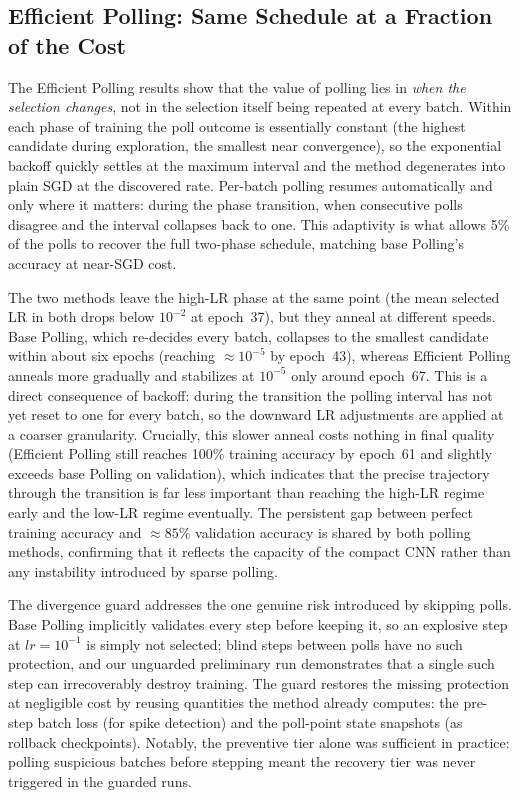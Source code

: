 \documentclass[conference]{IEEEtran}
\begin{document}
\subsection{Efficient Polling: Same Schedule at a Fraction of the Cost}

The Efficient Polling results show that the value of polling lies in \emph{when the selection changes}, not in the selection itself being repeated at every batch. Within each phase of training the poll outcome is essentially constant (the highest candidate during exploration, the smallest near convergence), so the exponential backoff quickly settles at the maximum interval and the method degenerates into plain SGD at the discovered rate. Per-batch polling resumes automatically and only where it matters: during the phase transition, when consecutive polls disagree and the interval collapses back to one. This adaptivity is what allows 5\% of the polls to recover the full two-phase schedule, matching base Polling's accuracy at near-SGD cost.

The two methods leave the high-LR phase at the same point (the mean selected LR in both drops below $10^{-2}$ at epoch~37), but they anneal at different speeds. Base Polling, which re-decides every batch, collapses to the smallest candidate within about six epochs (reaching $\approx 10^{-5}$ by epoch~43), whereas Efficient Polling anneals more gradually and stabilizes at $10^{-5}$ only around epoch~67. This is a direct consequence of backoff: during the transition the polling interval has not yet reset to one for every batch, so the downward LR adjustments are applied at a coarser granularity. Crucially, this slower anneal costs nothing in final quality (Efficient Polling still reaches 100\% training accuracy by epoch~61 and slightly exceeds base Polling on validation), which indicates that the precise trajectory through the transition is far less important than reaching the high-LR regime early and the low-LR regime eventually. The persistent gap between perfect training accuracy and $\approx 85\%$ validation accuracy is shared by both polling methods, confirming that it reflects the capacity of the compact CNN rather than any instability introduced by sparse polling.

The divergence guard addresses the one genuine risk introduced by skipping polls. Base Polling implicitly validates every step before keeping it, so an explosive step at $lr = 10^{-1}$ is simply not selected; blind steps between polls have no such protection, and our unguarded preliminary run demonstrates that a single such step can irrecoverably destroy training. The guard restores the missing protection at negligible cost by reusing quantities the method already computes: the pre-step batch loss (for spike detection) and the poll-point state snapshots (as rollback checkpoints). Notably, the preventive tier alone was sufficient in practice: polling suspicious batches before stepping meant the recovery tier was never triggered in the guarded runs.
\end{document}

